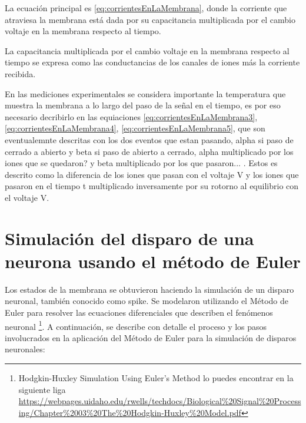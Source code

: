 La ecuación principal es \ref{eq:corrientesEnLaMembrana}, donde la corriente que atraviesa la membrana está dada por su capacitancia multiplicada por el cambio voltaje en la membrana respecto al tiempo.

La capacitancia multiplicada por el cambio voltaje en la membrana respecto al tiempo se expresa como las conductancias de los canales de iones  más la corriente recibida.

En las mediciones experimentales se considera importante la temperatura que muestra la membrana a lo largo del paso de la señal en el tiempo, es por eso necesario decribirlo en las equiaciones \ref{eq:corrientesEnLaMembrana3},  \ref{eq:corrientesEnLaMembrana4},  \ref{eq:corrientesEnLaMembrana5}, que son eventualemnte descritas con los dos eventos que estan pasando, alpha si paso de cerrado a abierto y beta si paso de abierto a cerrado, alpha multiplicado por los iones que se quedaron? y beta multiplicado por los que pasaron... . Estos es descrito como la diferencia de los iones que pasan con el voltaje V y los iones que pasaron en el tiempo t  multiplicado inversamente por su rotorno al equilibrio con el voltaje V.

 
\section{Simulación del disparo de una neurona usando el método de Euler}

Los estados de la membrana se obtuvieron haciendo la simulación de un disparo neuronal, también conocido como spike. Se modelaron utilizando el Método de Euler para resolver las ecuaciones diferenciales que describen el fenómenos neuronal \footnote{Hodgkin-Huxley Simulation Using Euler's Method lo puedes encontrar en la siguiente liga \url{https://webpages.uidaho.edu/rwells/techdocs/Biological\%20Signal\%20Processing/Chapter\%2003\%20The\%20Hodgkin-Huxley\%20Model.pdf}}. A continuación, se describe con detalle el proceso y los pasos involucrados en la aplicación del Método de Euler para la simulación de disparos neuronales:

